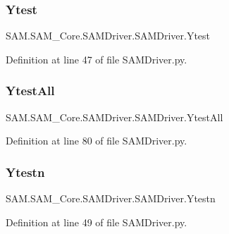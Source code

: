 \subsubsection{\texorpdfstring{Ytest}{Ytest}}
{\footnotesize\ttfamily S\+A\+M.\+S\+A\+M\+\_\+\+Core.\+S\+A\+M\+Driver.\+S\+A\+M\+Driver.\+Ytest}



Definition at line 47 of file S\+A\+M\+Driver.\+py.

\mbox{\label{group__icubclient__SAM__Drivers_ga61bc4612a1dd3b5d593798bb7e338c81}} 
\subsubsection{\texorpdfstring{Ytest\+All}{YtestAll}}
{\footnotesize\ttfamily S\+A\+M.\+S\+A\+M\+\_\+\+Core.\+S\+A\+M\+Driver.\+S\+A\+M\+Driver.\+Ytest\+All}



Definition at line 80 of file S\+A\+M\+Driver.\+py.

\mbox{\label{group__icubclient__SAM__Drivers_ga8ce3d609c06b6374b1c18a8236042186}} 
\subsubsection{\texorpdfstring{Ytestn}{Ytestn}}
{\footnotesize\ttfamily S\+A\+M.\+S\+A\+M\+\_\+\+Core.\+S\+A\+M\+Driver.\+S\+A\+M\+Driver.\+Ytestn}



Definition at line 49 of file S\+A\+M\+Driver.\+py.

